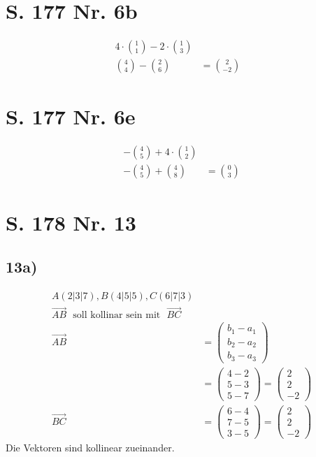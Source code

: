 \documentclass[12pt,a4paper]{report}
\begin{document}
	\section{S. 177 Nr. 6b}
	\begin{align*}
		4 \cdot \binom{1}{1} - 2 \cdot \binom{1}{3}& \\
		\binom{4}{4} - \binom{2}{6} &= \binom{2}{-2} &
	\end{align*}
	\section{S. 177 Nr. 6e}
	\begin{align*}
		-\binom{4}{5} + 4 \cdot \binom{1}{2} \\
		-\binom{4}{5} + \binom{4}{8} &= \binom{0}{3}
	\end{align*}
	
	\section{S. 178 Nr. 13}
	\subsection{13a)}
	\begin{align*}
		A(2|3|7), B(4|5|5), C(6|7|3) \\
		\overrightarrow{AB}\ \ \ \text{soll kollinar sein mit}\ \ \ \overrightarrow{BC} \\
		\overrightarrow{AB} &= \begin{pmatrix}
 	b_1 - a_1 \\
 	b_2 - a_2 \\
 	b_3 - a_3
 \end{pmatrix}
 \\
 &= \begin{pmatrix}
 	4 - 2 \\
 	5 - 3 \\
 	5 - 7
 \end{pmatrix} = \begin{pmatrix}
 	2 \\
 	2 \\
 	-2
 \end{pmatrix} \\
 	\overrightarrow{BC} &= \begin{pmatrix}
 	6 - 4 \\
 	7 - 5 \\
 	3 - 5
 \end{pmatrix} = \begin{pmatrix}
 	2 \\
 	2 \\
 	-2
 \end{pmatrix}
	\end{align*}
	Die Vektoren sind kollinear zueinander.
\end{document}
